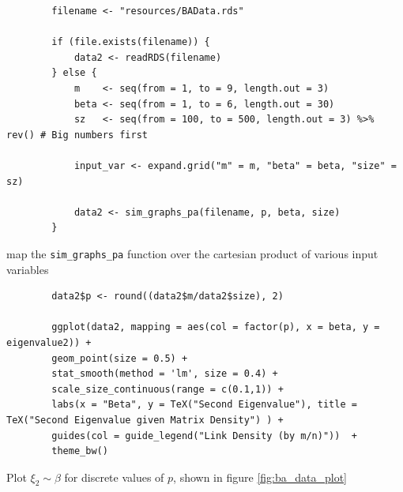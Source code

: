 \documentclass[11pt]{report}
\begin{document}
\begin{listing}[htbp]
    \begin{tcolorbox}
        \begin{verbatim}
        filename <- "resources/BAData.rds"

        if (file.exists(filename)) {
            data2 <- readRDS(filename)
        } else {
            m    <- seq(from = 1, to = 9, length.out = 3)
            beta <- seq(from = 1, to = 6, length.out = 30)
            sz   <- seq(from = 100, to = 500, length.out = 3) %>% rev() # Big numbers first

            input_var <- expand.grid("m" = m, "beta" = beta, "size" = sz)

            data2 <- sim_graphs_pa(filename, p, beta, size)
        }
        \end{verbatim}
    \end{tcolorbox}
 \caption{\label{l:gen_ba_data} map the \texttt{sim\_graphs\_pa} function over the cartesian product of various input variables}
\end{listing}

\begin{listing}[htbp]
    \begin{tcolorbox}
        \begin{verbatim}
        data2$p <- round((data2$m/data2$size), 2)

        ggplot(data2, mapping = aes(col = factor(p), x = beta, y = eigenvalue2)) +
        geom_point(size = 0.5) +
        stat_smooth(method = 'lm', size = 0.4) +
        scale_size_continuous(range = c(0.1,1)) +
        labs(x = "Beta", y = TeX("Second Eigenvalue"), title = TeX("Second Eigenvalue given Matrix Density") ) +
        guides(col = guide_legend("Link Density (by m/n)"))  +
        theme_bw()
        \end{verbatim}
    \end{tcolorbox}
\caption{\label{l:ba_data_plot} Plot \(\xi_{2} \sim \beta\) for discrete values of \(p\), shown in figure \ref{fig:ba_data_plot} }
\end{listing}
\end{document}
